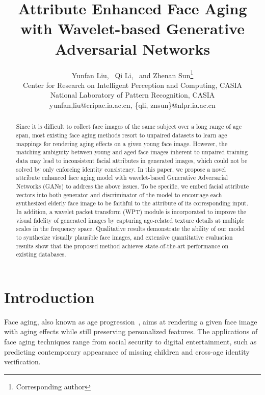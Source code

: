 \documentclass[letterpaper]{article} %
\begin{document}
 
%
\title{Attribute Enhanced Face Aging with Wavelet-based Generative Adversarial Networks}
\author{Yunfan Liu, \  Qi Li,  \ and Zhenan Sun\thanks{Corresponding author}\\
Center for Research on Intelligent Perception and Computing, CASIA\\
National Laboratory of Pattern Recognition, CASIA\\
yunfan,liu@cripac.ia.ac.cn, \{qli, znsun\}@nlpr.ia.ac.cn
}
\maketitle

\begin{abstract}
Since it is difficult to collect face images of the same subject over a long range of age span, most existing face aging methods resort to unpaired datasets to learn age mappings for rendering aging effects on a given young face image.
However, the matching ambiguity between young and aged face images inherent to unpaired training data may lead to inconsistent facial attributes in generated images, which could not be solved by only enforcing identity consistency.
In this paper, we propose a novel attribute enhanced face aging model with wavelet-based Generative Adversarial Networks (GANs) to address the above issues.
To be specific, we embed facial attribute vectors into both generator and discriminator of the model to encourage each synthesized elderly face image to be faithful to the attribute of its corresponding input.
In addition, a wavelet packet transform (WPT) module is incorporated to improve the visual fidelity of generated images by capturing age-related texture details at multiple scales in the frequency space. 
Qualitative results demonstrate the ability of our model to synthesize visually plausible face images, and extensive quantitative evaluation results show that the proposed method achieves state-of-the-art performance on existing databases.
\end{abstract}

\section{Introduction}
Face aging, also known as age progression~\cite{shu2015personalized}, aims at rendering a given face image with aging effects while still preserving personalized features. 
The applications of face aging techniques range from social security to digital entertainment, such as predicting contemporary appearance of missing children and cross-age identity verification. 
\end{document}
